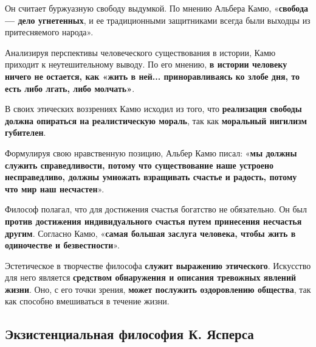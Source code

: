 \documentclass{article}
\begin{document}
\begin{flushleft}
\hfill

Он считает буржуазную свободу выдумкой. По мнению Альбера Камю, «\textbf{свобода — дело угнетенных}, и ее традиционными защитниками всегда были выходцы из притесняемого народа».

\hfill

Анализируя перспективы человеческого существования в истории, Камю приходит к неутешительному выводу. По его мнению, \textbf{в истории человеку ничего не остается, как «жить в ней... приноравливаясь ко злобе дня, то есть либо лгать, либо молчать»}.

\hfill

В своих этических воззрениях Камю исходил из того, что \textbf{реализация свободы должна опираться на реалистическую мораль}, так как \textbf{моральный нигилизм губителен}.

\hfill

Формулируя свою нравственную позицию, Альбер Камю писал: «\textbf{мы должны служить справедливости, потому что существование наше устроено несправедливо, должны умножать взращивать счастье и радость, потому что мир наш несчастен}».

\hfill

Философ полагал, что для достижения счастья богатство не обязательно. Он был \textbf{против достижения индивидуального счастья путем принесения несчастья другим}. Согласно Камю, «\textbf{самая большая заслуга человека, чтобы жить в одиночестве и безвестности}».

\hfill

Эстетическое в творчестве философа \textbf{служит выражению этического}. Искусство для него является \textbf{средством обнаружения и описания тревожных явлений жизни}. Оно, с его точки зрения, \textbf{может послужить оздоровлению общества}, так как способно вмешиваться в течение жизни.

\end{flushleft}

\pagebreak
\subsection{Экзистенциальная философия К. Ясперса}
\end{document}
